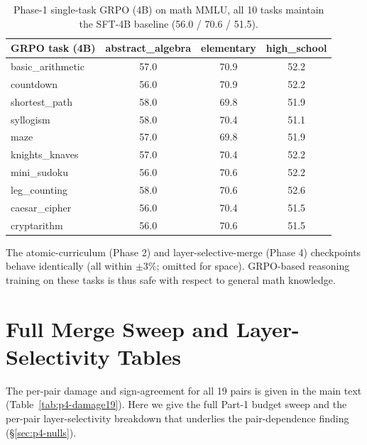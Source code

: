 \documentclass{article}
\begin{document}
\begin{table}[h]
\centering\small
\caption{Phase-1 single-task GRPO (4B) on math MMLU, all 10 tasks maintain the SFT-4B baseline
(56.0 / 70.6 / 51.5).}
\label{tab:mmlu-p1}
\begin{tabular}{lccc}
\toprule
GRPO task (4B) & abstract\_algebra & elementary & high\_school\\
\midrule
basic\_arithmetic & 57.0 & 70.9 & 52.2\\
countdown        & 56.0 & 70.9 & 52.2\\
shortest\_path    & 58.0 & 69.8 & 51.9\\
syllogism        & 58.0 & 70.4 & 51.1\\
maze             & 57.0 & 69.8 & 51.9\\
knights\_knaves   & 57.0 & 70.4 & 52.2\\
mini\_sudoku      & 56.0 & 70.6 & 52.2\\
leg\_counting     & 58.0 & 70.6 & 52.6\\
caesar\_cipher    & 56.0 & 70.4 & 51.5\\
cryptarithm      & 56.0 & 70.6 & 51.5\\
\bottomrule
\end{tabular}
\end{table}

The atomic-curriculum (Phase 2) and layer-selective-merge (Phase 4) checkpoints behave identically
(all within $\pm 3\%$; omitted for space). GRPO-based reasoning training on these tasks is thus
safe with respect to general math knowledge.

\clearpage

\section{Full Merge Sweep and Layer-Selectivity Tables}
\label{app:merge}
The per-pair damage and sign-agreement for all 19 pairs is given in the main text
(Table~\ref{tab:p4-damage19}). Here we give the full Part-1 budget sweep and the per-pair
layer-selectivity breakdown that underlies the pair-dependence finding (\S\ref{sec:p4-nulls}).
\end{document}
